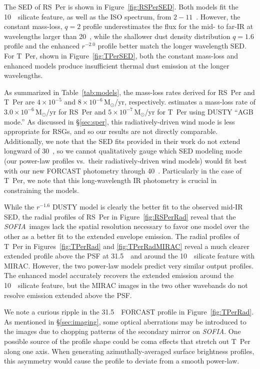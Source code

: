 \documentclass[modern]{aastex61}
\newcommand{\SOFIA}{{\it SOFIA}}
\begin{document}
The SED of RS~Per is shown in Figure~\ref{fig:RSPerSED}. Both models fit the 10~\micron\ silicate feature, as well as the ISO spectrum, from $2-11$~\micron. However, the constant mass-loss, $q=2$ profile underestimates the flux for the mid- to far-IR at wavelengths larger than 20~\micron, while the shallower dust density distribution $q=1.6$ profile and the enhanced $r^{-2.0}$ profile better match the longer wavelength SED.  For T~Per, shown in Figure~\ref{fig:TPerSED}, both the constant mass-loss and enhanced models produce insufficient thermal dust emission at the longer wavelengths.

As summarized in Table~\ref{tab:models}, the mass-loss rates derived for RS~Per and T~Per are $4\times10^{-5}$ and $8\times10^{-6}\,\mathrm{M}_\odot$/yr, respectively.  \cite{fok2012} estimates a mass-loss rate of $3.0\times10^{-6}\,\mathrm{M}_\odot$/yr for RS~Per and $5\times10^{-7}\,\mathrm{M}_\odot$/yr for T~Per using DUSTY ``AGB mode.''  As discussed in \S\ref{sec:sper}, this radiatively-driven wind mode is less appropriate for RSGs, and so our results are not directly comparable.  Additionally, we note that the SED fits provided in their work do not extend longward of 30~\micron, so we cannot qualitatively gauge which SED modeling mode (our power-law profiles vs.\ their radiatively-driven wind models) would fit best with our new FORCAST photometry through 40~\micron.  Particularly in the case of T~Per, we note that this long-wavelength IR photometry is crucial in constraining the models.

While the $r^{-1.6}$ DUSTY model is clearly the better fit to the observed mid-IR SED, the radial profiles of RS~Per in Figure~\ref{fig:RSPerRad} reveal that the \SOFIA\ images lack the spatial resolution necessary to favor one model over the other as a better fit to the extended envelope emission. The radial profiles of T~Per in Figures~\ref{fig:TPerRad} and \ref{fig:TPerRadMIRAC} reveal a much clearer extended profile above the PSF at 31.5~\micron\ and around the 10~\micron\ silicate feature with MIRAC.  However, the two power-law models predict very similar output profiles.  The enhanced model accurately recovers the extended emission around the 10~\micron\ silicate feature, but the MIRAC images in the two other wavebands do not resolve emission extended above the PSF.

We note a curious ripple in the 31.5~\micron\ FORCAST profile in Figure~\ref{fig:TPerRad}.  As mentioned in \S\ref{sec:imaging}, some optical aberrations may be introduced to the images due to chopping patterns of the secondary mirror on \SOFIA.  One possible source of the profile shape could be coma effects that stretch out T~Per along one axis.  When generating azimuthally-averaged surface brightness profiles, this asymmetry would cause the profile to deviate from a smooth power-law.
\end{document}
